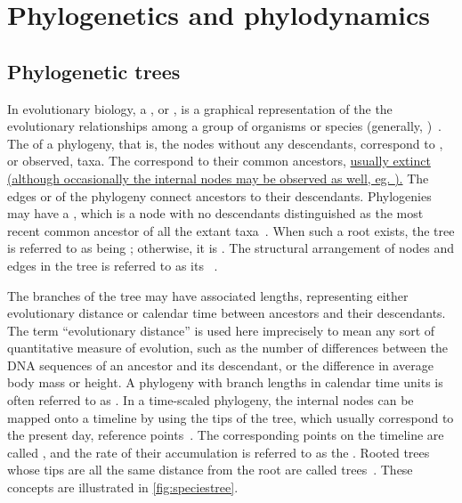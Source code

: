 \section{Phylogenetics and phylodynamics}
\label{sec:phylo}

\subsection{Phylogenetic trees}

In evolutionary biology, a , or , is a
graphical representation of the the evolutionary relationships among a group of
organisms or species (generally, )~\autocite{haeckel1866generelle}.
The  of a phylogeny, that is, the nodes without any descendants,
correspond to , or observed, taxa. The 
correspond to their common ancestors, {\color{blue}\uline{usually extinct
(although occasionally the internal nodes may be observed as well, eg.
\autocite{jombart2011reconstructing}).}} The edges or  of the
phylogeny connect ancestors to their descendants. Phylogenies may have a
, which is a node with no descendants distinguished as the most
recent common ancestor of all the extant
taxa~\autocite{harding1971probabilities}. When such a root exists, the tree is
referred to as being ; otherwise, it is . The
structural arrangement of nodes and edges in the tree is referred to as its
~\autocite{cavalli1967phylogenetic}. 

The branches of the tree may have associated lengths, representing either
evolutionary distance or calendar time between ancestors and their descendants.
The term ``evolutionary distance'' is used here imprecisely to mean any sort of
quantitative measure of evolution, such as the number of differences between
the DNA sequences of an ancestor and its descendant, or the difference in
average body mass or height. A phylogeny with branch lengths in calendar time
units is often referred to as . In a time-scaled phylogeny,
the internal nodes can be mapped onto a timeline by using the tips of the tree,
which usually correspond to the present day, reference
points~\autocite{nee1992tempo}. The corresponding points on the timeline are
called , and the rate of their accumulation is referred
to as the . Rooted trees whose tips are all the same
distance from the root are called 
trees~\autocite{buneman1974note}. These concepts are illustrated in
\cref{fig:speciestree}.

